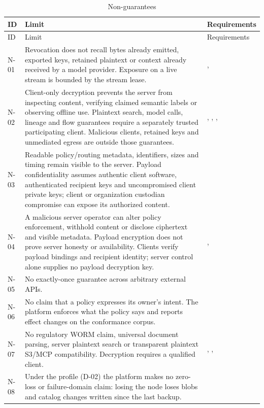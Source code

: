 \begin{longtable}{@{}P{0.07\textwidth}P{0.55\textwidth}P{0.27\textwidth}@{}}
\caption{Non-guarantees}\label{tab:nonguarantees}\\
\toprule ID & Limit & Requirements\\\midrule\endfirsthead
\toprule ID & Limit & Requirements\\\midrule\endhead
N-01 & Revocation does not recall bytes already emitted, exported keys, retained plaintext or context already received by a model provider. Exposure on a live stream is bounded by the stream lease. & , \\
N-02 & Client-only decryption prevents the server from inspecting content, verifying claimed semantic labels or observing offline use. Plaintext search, model calls, lineage and flow guarantees require a separately trusted participating client. Malicious clients, retained keys and unmediated egress are outside those guarantees. & , , , \\
N-03 & Readable policy/routing metadata, identifiers, sizes and timing remain visible to the server. Payload confidentiality assumes authentic client software, authenticated recipient keys and uncompromised client private keys; client or organization custodian compromise can expose its authorized content. & \\
N-04 & A malicious server operator can alter policy enforcement, withhold content or disclose ciphertext and visible metadata. Payload encryption does not prove server honesty or availability. Clients verify payload bindings and recipient identity; server control alone supplies no payload decryption key. & , \\
N-05 & No exactly-once guarantee across arbitrary external APIs. & \\
N-06 & No claim that a policy expresses its owner's intent. The platform enforces what the policy says and reports effect changes on the conformance corpus. & \\
N-07 & No regulatory WORM claim, universal document parsing, server plaintext search or transparent plaintext S3/MCP compatibility. Decryption requires a qualified client. & , , \\
N-08 & Under the  profile (D-02) the platform makes no zero-loss or failure-domain claim: losing the node loses blobs and catalog changes written since the last backup. & \\
\bottomrule
\end{longtable}

